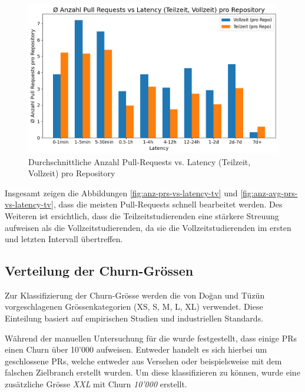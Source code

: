 \begin{figure}[htbp]
    \includegraphics[width=\textwidth]{Figures/anz-avg-prs-vs-latency-tv.png}
    \caption{Durchschnittliche Anzahl Pull-Requests vs. Latency (Teilzeit, Vollzeit) pro Repository}
    \label{fig:anz-avg-prs-vs-latency-tv}
\end{figure}

Insgesamt zeigen die Abbildungen \autoref{fig:anz-prs-vs-latency-tv} und \autoref{fig:anz-avg-prs-vs-latency-tv}, dass die meisten Pull-Requests schnell bearbeitet werden. Des Weiteren ist ersichtlich, dass die Teilzeitstudierenden eine stärkere Streuung aufweisen als die Vollzeitstudierenden, da sie die Vollzeitstudierenden im ersten und letzten Intervall übertreffen.

\subsection{Verteilung der Churn-Grössen}
Zur Klassifizierung der Churn-Grösse werden die von Doğan und Tüzün \parencite{dogan_towards_2022} vorgeschlagenen Grössenkategorien (XS, S, M, L, XL) verwendet. Diese Einteilung basiert auf empirischen Studien und industriellen Standards.

Während der manuellen Untersuchung für die  wurde festgestellt, dass einige PRs einen Churn über 10'000 aufweisen. Entweder handelt es sich hierbei um geschlossene PRs, welche entweder aus Versehen oder beispielsweise mit dem falschen Zielbranch erstellt wurden. Um diese klassifizieren zu können, wurde eine zusätzliche Grösse \textit{XXL} mit Churn \textit{10'000} erstellt. 

